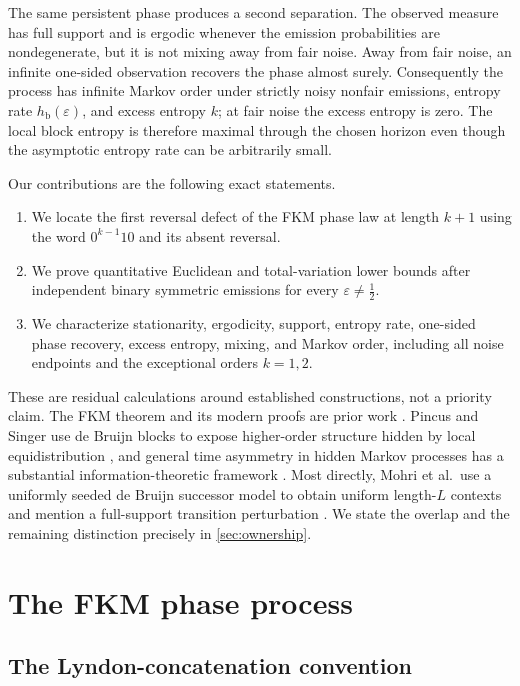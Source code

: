 \documentclass[11pt,a4paper]{amsart}
\theoremstyle{definition}
\theoremstyle{remark}
\newcommand{\hb}{h_{\mathrm b}}
\begin{document}
The same persistent phase produces a second separation.  The observed
measure has full support and is ergodic whenever the emission probabilities
are nondegenerate, but it is not mixing away from fair noise.  Away from fair
noise, an infinite one-sided observation recovers the phase almost surely.  Consequently the
process has infinite Markov order under strictly noisy nonfair emissions,
entropy rate $\hb(\varepsilon)$, and excess entropy $k$; at fair noise the
excess entropy is zero.  The local block
entropy is therefore maximal through the chosen horizon even though the
asymptotic entropy rate can be arbitrarily small.

Our contributions are the following exact statements.
\begin{enumerate}
\item We locate the first reversal defect of the FKM phase law at length
      $k+1$ using the word $0^{k-1}10$ and its absent reversal.
\item We prove quantitative Euclidean and total-variation lower bounds after
      independent binary symmetric emissions for every
      $\varepsilon\neq\tfrac12$.
\item We characterize stationarity, ergodicity, support, entropy rate,
      one-sided phase recovery, excess entropy, mixing, and Markov order,
      including all noise endpoints and the exceptional orders $k=1,2$.
\end{enumerate}

These are residual calculations around established constructions, not a
priority claim.  The FKM theorem and its modern proofs are prior work
\cite{FredricksenMaiorana1978,AmramEtAl2025}.  Pincus and Singer use de
Bruijn blocks to expose higher-order structure hidden by local
equidistribution \cite{PincusSinger2014}, and general time asymmetry in hidden
Markov processes has a substantial information-theoretic framework
\cite{EllisonEtAl2011}.  Most directly, Mohri et al.\ use a uniformly seeded
de Bruijn successor model to obtain uniform length-$L$ contexts and mention a
full-support transition perturbation \cite{MohriEtAl2026}.  We state the
overlap and the remaining distinction precisely in \cref{sec:ownership}.

\section{The FKM phase process}
\label{sec:setup}

\subsection{The Lyndon-concatenation convention}
\end{document}
